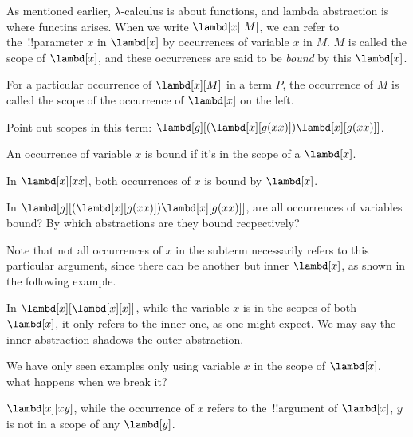 \documentclass[../../../include/open-logic-section]{subfiles}
\begin{document}

As mentioned earlier, $\lambda$-calculus is about functions, and
lambda abstraction is where functins arises. When we
write $\lambd[x][M]$, we can refer to the~!!{parameter} $x$ in $\lambd[x]$ by
occurrences of variable $x$ in $M$. $M$ is called the
scope of $\lambd[x]$, and these occurrences are said to be \emph{bound} by this
$\lambd[x]$. 

\begin{defn}[Scope]
For a particular occurrence of $\lambd[x][M]$ in a term $P$, the
occurrence of $M$ is called the scope of the occurrence of $\lambd[x]$
on the left.
\end{defn}

\begin{prob}
  Point out scopes in this term: $\lambd[g][(\lambd[x][g (x x)]) \lambd[x][g (x x)]]$.
\end{prob}

\begin{defn}
  An occurrence of variable $x$ is bound if it's in the scope of a $\lambd[x]$.
\end{defn}

\begin{ex}
  In $\lambd[x][x x]$, both occurrences of $x$ is bound by $\lambd[x]$.
\end{ex}

\begin{prob}
  In $\lambd[g][(\lambd[x][g (x x)]) \lambd[x][g (x x)]]$, are all
  occurrences of variables bound? By which abstractions are they
  bound recpectively?
\end{prob}

Note that not all occurrences of $x$ in the subterm necessarily refers to this particular argument,
since there can be another but inner $\lambd[x]$, as shown in the
following example. 
\begin{ex}
In $\lambd[x][\lambd[x][x]]$, while the variable $x$ is in the
scopes of both $\lambd[x]$, it only refers to the inner one, as one
might expect. We may say the inner abstraction shadows the outer
abstraction.
\end{ex}

We have only seen examples only using variable $x$ in the scope of $\lambd[x]$, 
what happens when we break it?
\begin{ex}
  $\lambd[x][x y]$, while the occurrence of $x$ refers to the~!!{argument} of $\lambd[x]$, $y$ is not in a scope
  of any $\lambd[y]$. 
\end{ex}
\end{document}
